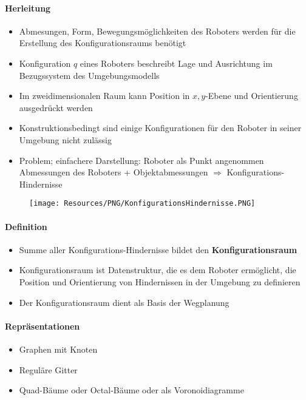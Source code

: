 \paragraph{Herleitung}
\begin{itemize}
	\item Abmesungen, Form, Bewegungsmöglichkeiten des Roboters werden für die
		Erstellung des Konfigurationsraums benötigt
	\item Konfiguration $q$ eines Roboters beschreibt Lage und Ausrichtung im
		Bezugssystem des Umgebungsmodells
	\item Im zweidimensionalen Raum kann Position in $x,y$-Ebene und Orientierung ausgedrückt werden
	\item Konstruktionsbedingt sind einige Konfigurationen für den Roboter in seiner Umgebung nicht zulässig
	\item Problem; einfachere Darstellung:
	\subitem Roboter als Punkt angenommen
	\subitem Abmessungen des Roboters + Objektabmessungen $\Rightarrow$ Konfigurations-Hindernisse
\end{itemize}
\begin{figure}[H]
	\begin{center}
		\texttt{[image: Resources/PNG/KonfigurationsHindernisse.PNG]}
		\caption{}
		\label{fig:PNG/KonfigurationsHindernisse.PNG}
	\end{center}
\end{figure}
\paragraph{Definition}
\begin{itemize}
	\item Summe aller Konfigurations-Hindernisse bildet den \textbf{Konfigurationsraum}
	\item Konfigurationsraum ist Datenstruktur, die es dem Roboter ermöglicht, die Position und Orientierung von Hindernissen in der Umgebung zu definieren
	\item Der Konfigurationsraum dient als Basis der Wegplanung
\end{itemize}
\paragraph{Repräsentationen}
\begin{itemize}
	\item Graphen mit Knoten
	\item Reguläre Gitter
	\item Quad-Bäume oder Octal-Bäume oder als Voronoidiagramme
\end{itemize}
